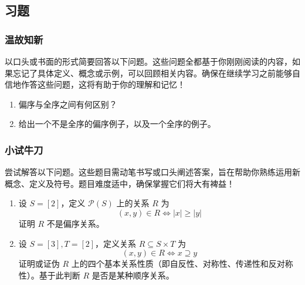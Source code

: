 
\subsection{习题}

\subsubsection*{温故知新}

以口头或书面的形式简要回答以下问题。这些问题全都基于你刚刚阅读的内容，如果忘记了具体定义、概念或示例，可以回顾相关内容。确保在继续学习之前能够自信地作答这些问题，这将有助于你的理解和记忆！

\begin{enumerate}[label=(\arabic*)]
    \item 偏序与全序之间有何区别？
    \item 给出一个不是全序的偏序例子，以及一个全序的例子。
\end{enumerate}

\subsubsection*{小试牛刀}

尝试解答以下问题。这些题目需动笔书写或口头阐述答案，旨在帮助你熟练运用新概念、定义及符号。题目难度适中，确保掌握它们将大有裨益！

\begin{enumerate}[label=(\arabic*)]
    \item 设 $S=[2]$，定义 $\mathcal{P}(S)$ 上的关系 $R$ 为 
    \[(x, y) \in R \iff |x| \ge |y|\]
    证明 $R$ 不是偏序关系。
    \item 设 $S=[3], T=[2]$，定义关系 $R \subseteq S \times T$ 为
    \[(x, y) \in R \iff x \supseteq y\]
    证明或证伪 $R$ 上的四个基本关系性质（即自反性、对称性、传递性和反对称性）。基于此判断 $R$ 是否是某种顺序关系。
\end{enumerate}